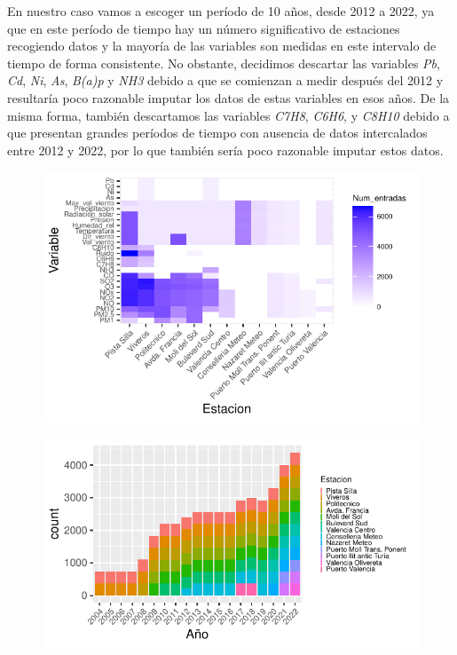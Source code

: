 \documentclass[notspecified,article,submit,moreauthors,pdftex]{Definitions/mdpi}
\begin{document}
En nuestro caso vamos a escoger un período de 10 años, desde 2012 a
2022, ya que en este período de tiempo hay un número significativo de
estaciones recogiendo datos y la mayoría de las variables son medidas en
este intervalo de tiempo de forma consistente. No obstante, decidimos
descartar las variables \emph{Pb}, \emph{Cd}, \emph{Ni}, \emph{As},
\emph{B(a)p} y \emph{NH3} debido a que se comienzan a medir después del
2012 y resultaría poco razonable imputar los datos de estas variables en
esos años. De la misma forma, también descartamos las variables
\emph{C7H8}, \emph{C6H6}, y \emph{C8H10} debido a que presentan grandes
períodos de tiempo con ausencia de datos intercalados entre 2012 y 2022,
por lo que también sería poco razonable imputar estos datos.

\begin{figure}

\includegraphics[width=0.7\linewidth]{ProyectoAED2023_files/figure-latex/mapa_calor-1} \hfill{}

\caption{\label{fig:mapa_calor}}\label{fig:mapa_calor}
\end{figure}

\begin{figure}

\includegraphics[width=0.7\linewidth]{ProyectoAED2023_files/figure-latex/estaciones_activas-1} \hfill{}

\caption{\label{fig:estaciones_activas}}\label{fig:estaciones_activas}
\end{figure}
\end{document}
